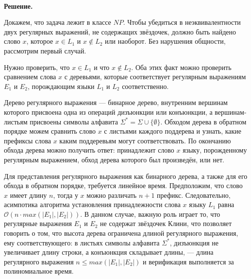 \documentclass[10pt]{article}
\begin{document}
\ \\[0.3cm]
\textbf{Решение.}  
\medskip\par 
Докажем, что задача лежит в классе $NP$. Чтобы убедиться в неэквивалентности двух регулярных выражений, не содержащих звёздочек, должно быть найдено слово $x$, которое $x\in L_1$ и $x\not\in L_2$ или наоборот. Без нарушения общности, рассмотрим первый случай.
\medskip\par Нужно проверить, что $x\in L_1$ и что $x\not\in L_2$. Оба этих факт можно проверить сравнением слова $x$ с деревьями, которые соответствует регулярным выражениям $E_1$ и $E_2$, порождающим языки $L_1$ и $L_2$ соответственно.
\medskip\par Дерево регулярного выражения --- бинарное дерево, внутренним вершинам которого присвоена одна из операций дизъюнкции или конъюнкции, а вершинам-листьям присвоены символы алфавита $\Sigma^*=\Sigma \cup \{\emptyset\}$. Обходом дерева в обратном порядке можем сравнить слово $x$ с листьями каждого поддерева и узнать, какие префиксы слова $x$ каким поддеревьям могут соответствовать. По окончанию обхода дерева можно получить ответ: принадлежит слово $x$ языку, порожденному регулярным выражением, обход дерева которого был произведён, или нет.
\medskip\par Для представления регулярного выражения как бинарного дерева, а также для его обхода в обратном порядке, требуется линейное время. Предположим, что слово $x$ имеет длину $n$, тогда у $x$ можно различать $n+1$ префикс. Следовательно, асимпотика алгоритма установления принадлежности слова $x$ языку $L_1$ равна $\mathcal{O}\left(n\cdot max\left(|E_1|,|E_2|\right)\right)$. В данном случае, важную роль играет то, что регулярные выражения $E_1$ и $E_2$ не содержат звёздочек Клини, что позволяет говорить о том, что высота дерева ограничена длиной регулярного выражения, ему соответствующего: в листьях символы алфавита $\Sigma^*$, дизъюнкция не увеличивает длину строки, а конъюнкция складывает длины, --- длина регулярного выражения $n\leq max\left(|E_1|,|E_2|\right)$ и верификация выполняется за полиномиальное время.
\end{document}
